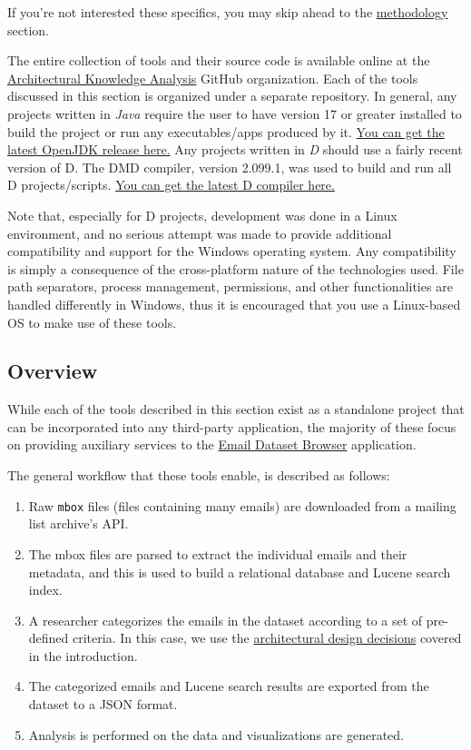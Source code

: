 \documentclass[a4paper, 12pt]{article}
\begin{document}
	\footnotesize
	If you're not interested these specifics, you may skip ahead to the \hyperref[sec:methodology]{methodology} section.
	\normalsize
	
	The entire collection of tools and their source code is available online at the \href{https://github.com/ArchitecturalKnowledgeAnalysis}{Architectural Knowledge Analysis} GitHub organization. Each of the tools discussed in this section is organized under a separate repository. In general, any projects written in \textit{Java} require the user to have version 17 or greater installed to build the project or run any executables/apps produced by it. \href{https://adoptium.net/temurin/releases}{You can get the latest OpenJDK release here.} Any projects written in \textit{D} should use a fairly recent version of D. The DMD compiler, version 2.099.1, was used to build and run all D projects/scripts. \href{https://dlang.org/download.html}{You can get the latest D compiler here.}
	
	Note that, especially for D projects, development was done in a Linux environment, and no serious attempt was made to provide additional compatibility and support for the Windows operating system. Any compatibility is simply a consequence of the cross-platform nature of the technologies used. File path separators, process management, permissions, and other functionalities are handled differently in Windows, thus it is encouraged that you use a Linux-based OS to make use of these tools.
	
	\subsection{Overview}
		While each of the tools described in this section exist as a standalone project that can be incorporated into any third-party application, the majority of these focus on providing auxiliary services to the \hyperref[sec:email-dataset-browser]{Email Dataset Browser} application.
		
		The general workflow that these tools enable, is described as follows:
		
		\begin{enumerate}
			\item Raw \texttt{mbox} files (files containing many emails) are downloaded from a mailing list archive's API.
			\item The mbox files are parsed to extract the individual emails and their metadata, and this is used to build a relational database and Lucene search index.
			\item A researcher categorizes the emails in the dataset according to a set of pre-defined criteria. In this case, we use the \hyperref[sec:design-decisions]{architectural design decisions} covered in the introduction.
			\item The categorized emails and Lucene search results are exported from the dataset to a JSON format.
			\item Analysis is performed on the data and visualizations are generated.
		\end{enumerate}
	
\end{document}
